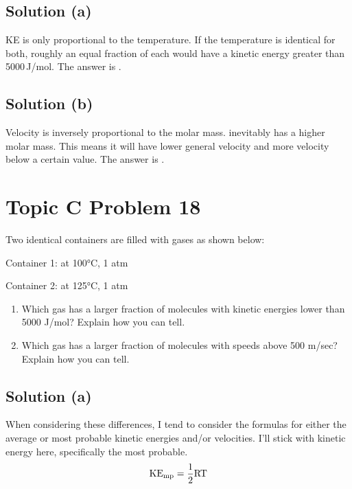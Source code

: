 \documentclass[10pt]{article}
\begin{document}
        \subsection{Solution (a)}
            KE is only proportional to the temperature.
            If the temperature is identical for both, roughly an equal fraction of each would have a kinetic energy greater than 5000\,\unit{\joule/\mole}. 
            The answer is . 

        \subsection{Solution (b)}
            Velocity is inversely proportional to the molar mass.
             inevitably has a higher molar mass.
            This means it will have lower general velocity and more velocity below a certain value.
            The answer is . 

    \pagebreak
    \section{Topic C Problem 18}
        Two identical containers are filled with gases as shown below:

        Container 1:  at 100\unit{\celsius}, 1 atm 
        
        Container 2:  at 125\unit{\celsius}, 1 atm

        \begin{enumerate} [label=\alph*)]
            \item Which gas has a larger fraction of molecules with kinetic energies lower than 5000 J/mol? Explain how you can tell.
            \item Which gas has a larger fraction of molecules with speeds above 500 m/sec? Explain how you can tell.
        \end{enumerate}

        \subsection{Solution (a)}
            When considering these differences, I tend to consider the formulas for either the average or most probable kinetic energies and/or velocities.
            I'll stick with kinetic energy here, specifically the most probable.
            \begin{equation}
                \rm
                KE_{\rm mp} = \frac{1}{2}RT
            \end{equation}
\end{document}
